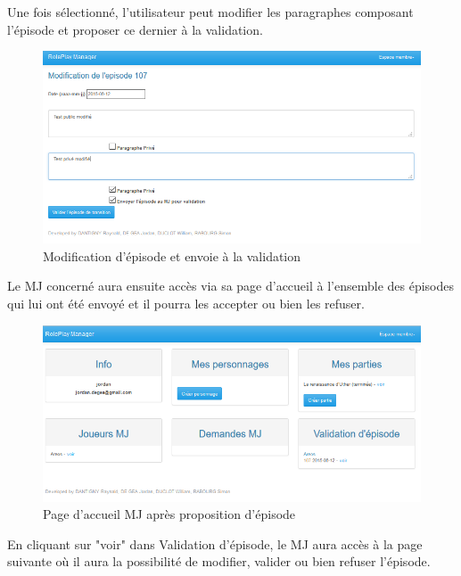 \documentclass[a4paper,oneside,10pt]{article}
\begin{document}
Une fois sélectionné, l'utilisateur peut modifier les paragraphes composant l'épisode et proposer ce dernier à la validation.

\begin{figure}[H]
	\begin{center}
		\includegraphics[width=\textwidth]{images/manuel/modifepisode2.png}  
		\caption{Modification d'épisode et envoie à la validation}
	\end{center}
\end{figure}

Le MJ concerné aura ensuite accès via sa page d'accueil à l'ensemble des épisodes qui lui ont été envoyé et il pourra les accepter ou bien les refuser.

\begin{figure}[H]
	\begin{center}
		\includegraphics[width=\textwidth]{images/manuel/pagemjepisode.png}  
		\caption{Page d'accueil MJ après proposition d'épisode}
	\end{center}
\end{figure}

En cliquant sur "voir" dans Validation d'épisode, le MJ aura accès à la page suivante où il aura la possibilité de modifier, valider ou bien refuser l'épisode.
\end{document}
